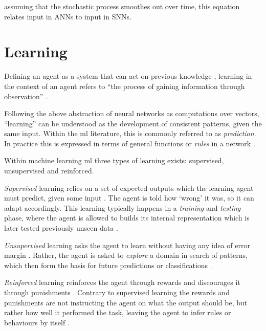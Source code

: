 \documentclass[report.tex]{subfiles}
\begin{document}
assuming that the stochastic process smoothes out over time, this equation
relates input in \glspl{ANN} to input in \glspl{SNN}.


\section{Learning}  \label{sec:learning}
Defining an \gls{agent} as a system that can act on previous knowledge
\cite{Russel2007}, learning in the context of an \gls{agent}
refers to ``the process of gaining
information through observation'' \cite{sep:learning-formal}.

Following the above abstraction of neural networks as computations over vectors,
``learning''  can be understood as the development of consistent
patterns, given the same input.
Within the \gls{ml} literature, this is commonly referred to as 
\textit{prediction}. 
In practice this is expressed in terms of general functions or
\textit{rules}  in a network \cite[p. 704.]{Russel2007}.

Within machine learning \gls{ml} three types of
learning exists: supervised, 
unsupervised  and reinforced.

\textit{Supervised} learning relies on a set of expected outputs which 
the learning \gls{agent} must predict, given some input \cite{Russel2007}.
The \gls{agent} is told how `wrong' it was, so it can adapt accordingly.
This learning typically happens in a \textit{training} and \textit{testing}
phase, where the \gls{agent} is allowed to builds its internal representation
which is later tested previously unseen data \cite{Russel2007}.

\textit{Unsupervised} learning asks the \gls{agent} to learn without
having any idea of error margin \cite{Russel2007}.
Rather, the \gls{agent} is asked to \textit{explore} a domain in search of
patterns, which then form the basis for future predictions or classifications
\cite{Russel2007}.

\textit{Reinforced} learning reinforces the \gls{agent} through
rewards and discourages it through punishments \cite{Russel2007}.
Contrary to supervised learning the rewards and punishments are not
instructing the agent on what the output should be, but rather how well
it performed the task, leaving the \gls{agent} to infer rules or
behaviours by itself \cite[p. 873]{Russel2007}.
\end{document}
